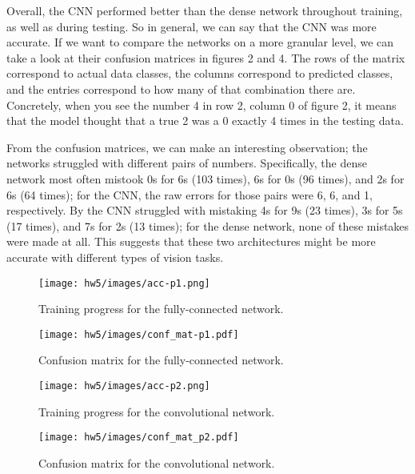 \documentclass[a4paper,10 pt]{article}
\begin{document}
Overall, the CNN performed better than the dense network throughout training, as well as during testing. So in general, we can say that the CNN was more accurate. If we want to compare the networks on a more granular level, we can take a look at their confusion matrices in figures 2 and 4. The rows of the matrix correspond to actual data classes, the columns correspond to predicted classes, and the entries correspond to how many of that combination there are. Concretely, when you see the number 4 in row 2, column 0 of figure 2, it means that the model thought that a true 2 was a 0 exactly 4 times in the testing data.

From the confusion matrices, we can make an interesting observation; the networks struggled with different pairs of numbers. Specifically, the dense network most often mistook 0s for 6s (103 times), 6s for 0s (96 times), and 2s for 6s (64 times); for the CNN, the raw errors for those pairs were 6, 6, and 1, respectively. By the CNN struggled with mistaking 4s for 9s (23 times), 3s for 5s (17 times), and 7s for 2s (13 times); for the dense network, none of these mistakes were made at all. This suggests that these two architectures might be more accurate with different types of vision tasks.

\begin{figure}[H]
  \centering
    \texttt{[image: hw5/images/acc-p1.png]}
    \label{fig:acc1}
    \caption{Training progress for the fully-connected network.}
\end{figure}

\begin{figure}[H]
  \centering
    \texttt{[image: hw5/images/conf\_mat-p1.pdf]}
    \label{fig:conf1}
    \caption{Confusion matrix for the fully-connected network.}
\end{figure}

\begin{figure}[H]
  \centering
    \texttt{[image: hw5/images/acc-p2.png]}
    \label{fig:acc2}
    \caption{Training progress for the convolutional network.}
\end{figure}

\begin{figure}[H]
  \centering
    \texttt{[image: hw5/images/conf\_mat\_p2.pdf]}
    \label{fig:conf2}
    \caption{Confusion matrix for the convolutional network.}
\end{figure}
\end{document}

